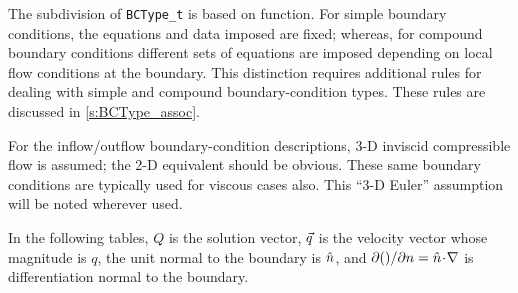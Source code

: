 The subdivision of \texttt{BCType\_t} is based on function.  For simple
boundary conditions, the equations and data imposed are fixed; whereas,
for compound boundary conditions different sets of equations are
imposed depending on local flow conditions at the boundary.  This
distinction requires additional rules for dealing with simple and
compound boundary-condition types.  These rules are discussed in
\autoref{s:BCType_assoc}.

For the inflow/outflow boundary-condition descriptions, 3-D inviscid
compressible flow is assumed; the 2-D equivalent should be obvious.
These same boundary conditions are typically used for viscous cases
also.  This ``3-D Euler'' assumption will be noted wherever used.

In the following tables, $Q$ is the solution vector, ${\vec{q}}$ is the
velocity vector whose magnitude is $q$, the unit normal to the boundary
is ${\hat{n}}$, and ${\partial () / \partial n} = {\hat{n}}\!\cdot\!\nabla$ is differentiation normal
to the boundary.

\newenvironment{mylist}
{\begin{list}{$\bullet$}{%
\topsep    0pt%
\parsep    0pt%
\partopsep 0pt%
\itemsep   0pt}}
{\end{list}}

